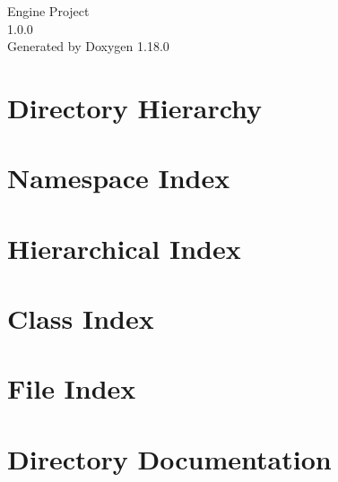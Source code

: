 \documentclass[twoside]{book}
\newcommand{\+}{\discretionary{\mbox{\scriptsize$\hookleftarrow$}}{}{}}
\newcommand{\clearemptydoublepage}{%
    \newpage{\pagestyle{empty}\cleardoublepage}%
  }
\begin{document}
  \raggedbottom
    \hypersetup{pageanchor=false,
                bookmarksnumbered=true,
                pdfencoding=unicode
               }
  \begin{titlepage}
  \vspace*{7cm}
  \begin{center}%
  {\Large Engine Project}\\
  [1ex]\large 1.\+0.\+0 \\
  \vspace*{1cm}
  {\large Generated by Doxygen 1.18.0}\\
  \end{center}
  \end{titlepage}
  \clearemptydoublepage
  \tableofcontents
  \clearemptydoublepage
  \hypersetup{pageanchor=true}

\chapter{Directory Hierarchy}

\chapter{Namespace Index}

\chapter{Hierarchical Index}

\chapter{Class Index}

\chapter{File Index}

\chapter{Directory Documentation}



















\end{document}
